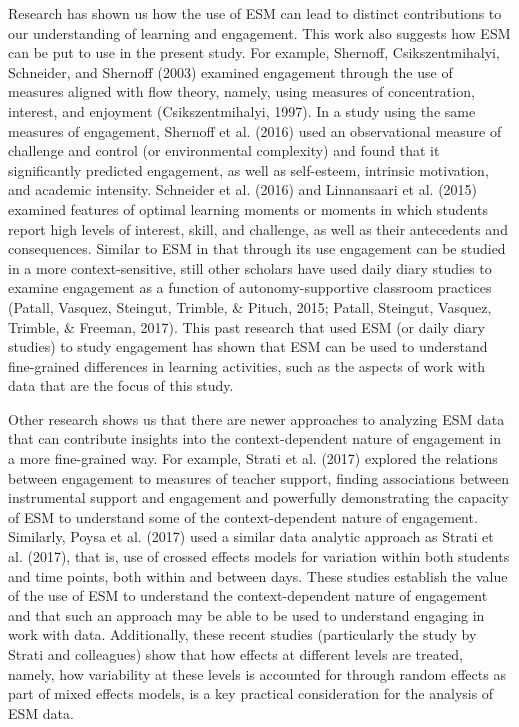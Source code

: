 \documentclass[]{book}
\theoremstyle{definition}
\theoremstyle{definition}
\theoremstyle{definition}
\theoremstyle{remark}
\begin{document}
Research has shown us how the use of ESM can lead to distinct
contributions to our understanding of learning and engagement. This work
also suggests how ESM can be put to use in the present study. For
example, Shernoff, Csikszentmihalyi, Schneider, and Shernoff (2003)
examined engagement through the use of measures aligned with flow
theory, namely, using measures of concentration, interest, and enjoyment
(Csikszentmihalyi, 1997). In a study using the same measures of
engagement, Shernoff et al. (2016) used an observational measure of
challenge and control (or environmental complexity) and found that it
significantly predicted engagement, as well as self-esteem, intrinsic
motivation, and academic intensity. Schneider et al. (2016) and
Linnansaari et al. (2015) examined features of optimal learning moments
or moments in which students report high levels of interest, skill, and
challenge, as well as their antecedents and consequences. Similar to ESM
in that through its use engagement can be studied in a more
context-sensitive, still other scholars have used daily diary studies to
examine engagement as a function of autonomy-supportive classroom
practices (Patall, Vasquez, Steingut, Trimble, \& Pituch, 2015; Patall,
Steingut, Vasquez, Trimble, \& Freeman, 2017). This past research that
used ESM (or daily diary studies) to study engagement has shown that ESM
can be used to understand fine-grained differences in learning
activities, such as the aspects of work with data that are the focus of
this study.

Other research shows us that there are newer approaches to analyzing ESM
data that can contribute insights into the context-dependent nature of
engagement in a more fine-grained way. For example, Strati et al. (2017)
explored the relations between engagement to measures of teacher
support, finding associations between instrumental support and
engagement and powerfully demonstrating the capacity of ESM to
understand some of the context-dependent nature of engagement.
Similarly, Poysa et al. (2017) used a similar data analytic approach as
Strati et al. (2017), that is, use of crossed effects models for
variation within both students and time points, both within and between
days. These studies establish the value of the use of ESM to understand
the context-dependent nature of engagement and that such an approach may
be able to be used to understand engaging in work with data.
Additionally, these recent studies (particularly the study by Strati and
colleagues) show that how effects at different levels are treated,
namely, how variability at these levels is accounted for through random
effects as part of mixed effects models, is a key practical
consideration for the analysis of ESM data.
\end{document}
